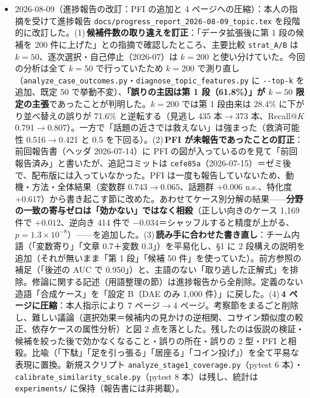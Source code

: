 \documentclass[11pt,a4paper]{jsarticle}
\begin{document}
\begin{itemize}[nosep]
  \item 2026-08-09（進捗報告の改訂：PFI の追加と 4 ページへの圧縮）：本人の指摘を受けて進捗報告 \texttt{docs/progress\_report\_2026-08-09\_topic.tex} を段階的に改訂した。(1)\,\textbf{候補件数の取り違えを訂正}：「データ拡張後に第 1 段の候補を 200 件に上げた」との指摘で確認したところ、主要比較 \texttt{strat\_A/B} は $k=50$、逐次選択・自己停止（2026-07）は $k=200$ と使い分けていた。今回の分析は全て $k=50$ で行っていたため $k=200$ で測り直し（\texttt{analyze\_case\_outcomes.py}・\texttt{diagnose\_topic\_features.py} に \texttt{-{}-top-k} を追加、既定 50 で挙動不変）、\textbf{「誤りの主因は第 1 段（61.8\%）」が $k=50$ 限定の主張}であったことが判明した。$k=200$ では第 1 段由来は 28.4\% に下がり並べ替えの誤りが 71.6\% と逆転する（見逃し 435 本$\to$373 本、Recall@$K$ 0.791$\to$0.807）。一方で「話題の近さでは救えない」は強まった（救済可能性 0.516$\to$0.421 と 0.5 を下回る）。(2)\,\textbf{PFI が未報告であったことの訂正}：前回報告書（ヘッダ 2026-07-14）に PFI の図が入っているのを見て「前回報告済み」と書いたが、追記コミットは \texttt{cefe85a}（2026-07-15）＝ゼミ後で、配布版には入っていなかった。PFI は一度も報告していないため、動機・方法・全体結果（変数群 $0.743\to0.065$、話題群 $+0.006$ n.s.、特化度 $+0.617$）から書き起こす節に改めた。あわせてケース別分解の結果——\textbf{分野の一致の寄与ゼロは「効かない」ではなく相殺}（正しい向きのケース 1{,}169 件で $+0.012$、逆向き 414 件で $-0.034$＝シャッフルすると精度が上がる、$p=1.3\times10^{-8}$）——を追加した。(3)\,\textbf{読み手に合わせた書き直し}：チーム内語（「変数寄り」「文章 0.7＋変数 0.3」）を平易化し、§1 に 2 段構えの説明を追加（それが無いまま「第 1 段」「候補 50 件」を使っていた）。前方参照の補足（「後述の AUC で 0.950」）と、主語のない「取り逃した正解式」を排除。修論に関する記述（用語整理の節）は進捗報告から全削除。定義のない造語「合成ケース」を「設定 B（DAE のみ 1{,}000 件）」に戻した。(4)\,\textbf{4 ページに圧縮}：本人指示により 7 ページ$\to$4 ページ。考察節をまるごと削除し、難しい議論（選択効果＝候補内の見かけの逆相関、コサイン類似度の較正、依存ケースの属性分析）と図 2 点を落とした。残したのは仮説の検証・候補を絞った後で効かなくなること・誤りの所在・誤りの 2 型・PFI と相殺。比喩（「下駄」「足を引っ張る」「居座る」「コイン投げ」）を全て平易な表現に置換。新規スクリプト \texttt{analyze\_stage1\_coverage.py}（pytest 6 本）・\texttt{calibrate\_similarity\_scale.py}（pytest 8 本）は残し、統計は \texttt{experiments/} に保持（報告書には非掲載）。
\end{itemize}
\end{document}
